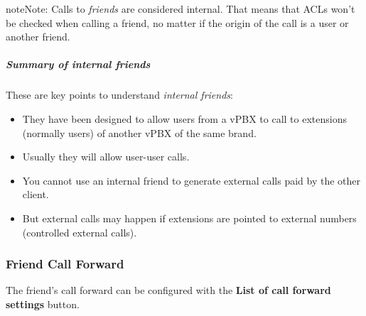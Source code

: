 \documentclass[letterpaper,10pt,english]{sphinxmanual}
\begin{document}
\begin{notice}{note}{Note:}
Calls to \emph{friends} are considered internal. That means that ACLs won't
be checked when calling a friend, no matter if the origin of the call
is a user or another friend.
\end{notice}


\subparagraph{Summary of internal friends}
\label{administration_portal/client/vpbx/routing_endpoints/friends/internal_friends:summary-of-internal-friends}
These are key points to understand \emph{internal friends}:
\begin{itemize}
\item {} 
They have been designed to allow users from a vPBX to call to extensions (normally users)
of another vPBX of the same brand.

\item {} 
Usually they will allow user-user calls.

\item {} 
You cannot use an internal friend to generate external calls paid by the other client.

\item {} 
But external calls may happen if extensions are pointed to external numbers (controlled external calls).

\end{itemize}


\subsubsection{Friend Call Forward}
\label{administration_portal/client/vpbx/routing_endpoints/friends/index:friend-call-forward}
The friend's call forward can be configured with the \textbf{List of call forward settings}  button.
\end{document}
